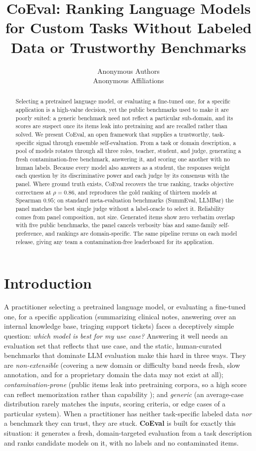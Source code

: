 \documentclass[11pt,a4paper]{article}
\title{CoEval: Ranking Language Models for Custom Tasks Without Labeled Data or Trustworthy Benchmarks}
\author{Anonymous Authors \\ Anonymous Affiliations}
\date{}
\begin{document}
\maketitle

\begin{abstract}
Selecting a pretrained language model, or evaluating a fine-tuned one, for a specific application is a high-value decision, yet the public benchmarks used to make it are poorly suited: a generic benchmark need not reflect a particular sub-domain, and its scores are suspect once its items leak into pretraining and are recalled rather than solved. We present CoEval, an open framework that supplies a trustworthy, task-specific signal through ensemble self-evaluation. From a task or domain description, a pool of models rotates through all three roles, teacher, student, and judge, generating a fresh contamination-free benchmark, answering it, and scoring one another with no human labels. Because every model also answers as a student, the responses weight each question by its discriminative power and each judge by its consensus with the panel. Where ground truth exists, CoEval recovers the true ranking, tracks objective correctness at $\rho = 0.86$, and reproduces the gold ranking of thirteen models at Spearman $0.95$; on standard meta-evaluation benchmarks (SummEval, LLMBar) the panel matches the best single judge without a label-oracle to select it. Reliability comes from panel composition, not size. Generated items show zero verbatim overlap with five public benchmarks, the panel cancels verbosity bias and same-family self-preference, and rankings are domain-specific. The same pipeline reruns on each model release, giving any team a contamination-free leaderboard for its application.
\end{abstract}

\section{Introduction}\label{introduction}

A practitioner selecting a pretrained language model, or evaluating a fine-tuned one, for a specific application
(summarizing clinical notes, answering over an internal knowledge base, triaging support tickets) faces a deceptively
simple question: \emph{which model is best for my use case?} Answering it well needs an evaluation set that reflects
that use case, and the static, human-curated benchmarks that dominate LLM evaluation make this hard in three ways. They
are \emph{non-extensible} (covering a new domain or difficulty band needs fresh, slow annotation, and for a
proprietary domain the data may not exist at all); \emph{contamination-prone} (public items leak into pretraining
corpora, so a high score can reflect memorization rather than capability \citep{ref12, ref13}); and \emph{generic} (an average-case distribution rarely matches the inputs, scoring criteria,
or edge cases of a particular system). When a practitioner has neither task-specific labeled data \emph{nor} a
benchmark they can trust, they are stuck. \textbf{CoEval} is built for exactly this situation: it generates a
fresh, domain-targeted evaluation from a task description and ranks candidate models on it, with no labels and no
contaminated items.
\end{document}
